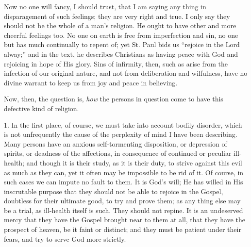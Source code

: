 Now no one will fancy, I should trust, that I am saying any thing
in disparagement of such feelings; they are very right and true. I
only say they should not be the whole of a man's religion. He ought to
have other and more cheerful feelings too. No one on earth is free
from imperfection and sin, no one but has much continually to repent
of; yet St. Paul bids us ``rejoice in the Lord alway;'' and in
the text, he describes Christians as having peace with God and
rejoicing in hope of His glory. Sins of infirmity, then, such as arise
from the infection of our original nature, and not from deliberation
and wilfulness, have no divine warrant to keep us from joy and peace
in believing.

Now, then, the question is, \emph{how} the persons in question come
to have this defective kind of religion.

1. In the first place, of course, we must take into account bodily
disorder, which is not unfrequently the cause of the perplexity of
mind I have been describing. Many persons have an anxious
self-tormenting disposition, or depression of spirits, or deadness of
the affections, in consequence of continued or peculiar ill-health;
and though it is their study, as it is their duty, to strive against
this evil as much as they can, yet it often may be impossible to be
rid of it. Of course, in such cases we can impute no fault to them. It
is God's will; He has willed in His inscrutable purpose that they
should not be able to rejoice in the Gospel, doubtless for their
ultimate good, to try and prove them; as any thing else may be a
trial, as ill-health itself is such. They should not repine. It is an
undeserved mercy that they have the Gospel brought near to them at
all, that they have the prospect of heaven, be it faint or distinct;
and they must be patient under their fears, and try to serve God more
strictly.

